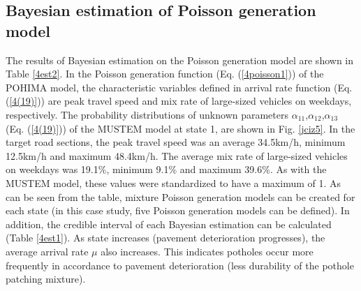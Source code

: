 \documentclass[Journal]{ascelike}
\begin{document}
\subsection{Bayesian estimation of Poisson generation model}
The results of Bayesian estimation on the Poisson generation model are shown in Table \ref{4est2}. In the Poisson generation function (Eq. (\ref{4poisson1})) of the POHIMA model, the characteristic variables defined in arrival rate function (Eq. (\ref{4(19)})) are peak travel speed and mix rate of large-sized vehicles on weekdays, respectively. The probability distributions of unknown parameters $\alpha_{11}$,$\alpha_{12}$,$\alpha_{13}$ (Eq. (\ref{4(19)})) of the MUSTEM model at state 1, are shown in Fig. \ref{jciz5}. In the target road sections, the peak travel speed was an average 34.5km/h, minimum 12.5km/h and maximum 48.4km/h. The average mix rate of large-sized vehicles on weekdays was 19.1\%, minimum 9.1\% and maximum 39.6\%. As with the MUSTEM model, these values were standardized to have a maximum of 1. As can be seen from the table, mixture Poisson generation models can be created for each state (in this case study, five Poisson generation models can be defined). In addition, the credible interval of each Bayesian estimation can be calculated (Table \ref{4est1}). As state increases (pavement deterioration progresses), the average arrival rate $\mu$ also increases. This indicates potholes occur more frequently in accordance to pavement deterioration (less durability of the pothole patching mixture).
%
\end{document}
